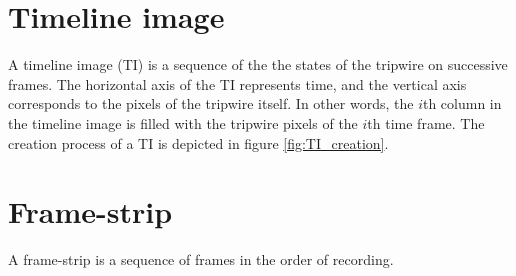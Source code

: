 \section{Timeline image}
A timeline image (TI) is a sequence of the the states of the tripwire on successive frames.
The horizontal axis of the TI represents time, and the vertical axis corresponds to the pixels of the tripwire itself. 
In other words, the $i$th column in the timeline image is filled with the tripwire pixels of the $i$th time frame.
The creation process of a TI is depicted in figure \ref{fig:TI_creation}.
\section{Frame-strip}
A frame-strip is a sequence of frames in the order of recording.

